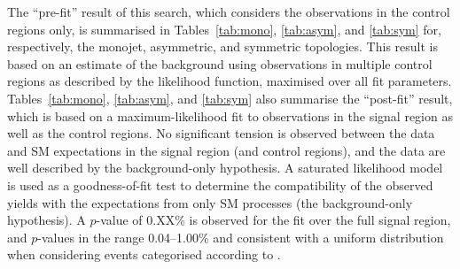 
The ``pre-fit'' result of this search, which considers the
observations in the control regions only, is summarised in
Tables~\ref{tab:mono}, \ref{tab:asym}, and \ref{tab:sym} for,
respectively, the monojet, asymmetric, and symmetric topologies. This
result is based on an estimate of the \znunuj background using
observations in multiple control regions as described by the
likelihood function, maximised over all fit
parameters. Tables~\ref{tab:mono}, \ref{tab:asym}, and \ref{tab:sym}
also summarise the ``post-fit'' result, which is based on a
maximum-likelihood fit to observations in the signal region as well as
the control regions. No significant tension is observed between the
data and SM expectations in the signal region (and control regions),
and the data are well described by the background-only hypothesis. A
saturated likelihood model~\cite{} is used as a goodness-of-fit test
to determine the compatibility of the observed yields with the
expectations from only SM processes (\ie the background-only
hypothesis). A $p$-value of 0.XX\% is observed for the fit over the
full signal region, and $p$-values in the range 0.04--1.00\% and
consistent with a uniform distribution when considering events
categorised according to \njet. 



